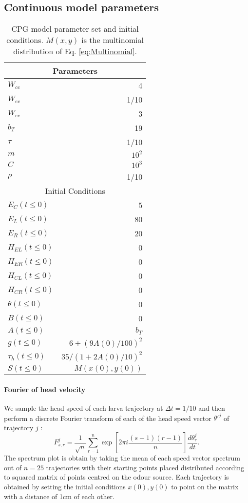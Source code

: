 \documentclass[10pt,a4paper]{article}
\begin{document}
\subsection{Continuous model parameters}
\begin{table}[ht]
 \centering
\begin{tabular}{| l | r |}
 \hline 
\multicolumn{2}{|c|}{Parameters} \\
 \hline 
$W_{cc}$ & 4 \\ \hline
$W_{ec}$ & 1/10\\ \hline
$W_{ee}$ & 3\\ \hline
$b_T$ & 19 \\ \hline
$\tau$ & 1/10 \\ \hline
$m$ & $10^2$ \\ \hline
$C$ & $10^3$ \\ \hline
$\rho$ & 1/10 \\ %
 \hline 
\multicolumn{2}{|c|}{Initial Conditions} \\
 \hline 
$E_C(t \leq 0)$ & 5 \\
$E_L(t \leq 0)$ & 80 \\
$E_R(t \leq 0)$ & 20 \\
$H_{EL}(t \leq 0)$ & 0 \\
$H_{ER}(t \leq 0)$ & 0 \\
$H_{CL}(t \leq 0)$ & 0 \\
$H_{CR}(t \leq 0)$ & 0 \\
$\theta(t \leq 0) $ & 0 \\
$B(t \leq 0) $ & 0 \\
$A(t \leq 0) $ & $b_T$ \\
$g(t \leq 0) $ & $6 + (9 A(0)/100)^2$ \\
$\tau_h(t \leq 0) $ & $35 / (1 + 2A(0)/10)^2$ \\ 
$S(t \leq 0) $ & $M(x(0),y(0))$ \\ \hline
\end{tabular}
 \caption{CPG model parameter set and initial conditions. $M(x,y)$ is the multinomial distribution of Eq. \eqref{eq:Multinomial}. }
 \label{tbl:OscparameterSet}
\end{table}


\paragraph{Fourier of head velocity}
We sample the head speed of each larva trajectory at $\Delta t = 1/10$ and then perform a discrete Fourier transform of each of the head speed vector $\theta'^j$ of trajectory $j$ :
\begin{equation}
F_{s,r}^j = \frac{1}{\sqrt{n}} \sum_{r=1}^n \exp{[2 \pi i \frac{ (s-1)(r-1)}{n}]} \frac{d\theta_r^j}{dt}.
\end{equation}
The spectrum plot is obtain by taking the mean of each speed vector spectrum out of $n=25$ trajectories with their starting points placed distributed according to squared matrix of points centred on the odour source. Each trajectory is obtained by setting the initial conditions $x(0),y(0)$ to point on the matrix with a distance of 1cm of each other.
\end{document}
